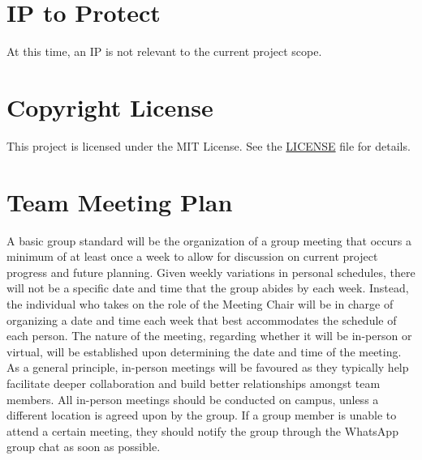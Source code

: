 \documentclass{article}
\begin{document}
\iffalse
\wss{For most teams this section will just state that there is no confidential
information to protect.}
\fi
\section{IP to Protect}

\iffalse
\wss{State whether there is IP to protect.  If there is, point to the agreement.
All students who are working on a project that requires an IP agreement are also
required to sign the ``Intellectual Property Guide Acknowledgement.''}
\fi

At this time, an IP is not relevant to the current project scope.

\section{Copyright License}

\iffalse
\wss{What copyright license is your team adopting.  Point to the license in your
repo.}
\fi

This project is licensed under the MIT License. See the \href{./LICENSE}{LICENSE} file for details.

\section{Team Meeting Plan}

\iffalse
\wss{How often will you meet? where?}

\wss{If the meeting is a physical location (not virtual), out of an abundance of
caution for safety reasons you shouldn't put the location online}

\wss{How often will you meet with your industry advisor?  when?  where?}

\wss{Will meetings be virtual?  At least some meetings should likely be
in-person.}

\wss{How will the meetings be structured?  There should be a chair for all meetings.  There should be an agenda for all meetings.}
\fi

A basic group standard will be the organization of a group meeting that occurs a minimum of at least once a week to
allow for discussion on current project progress and future planning. Given weekly variations in personal schedules, there
will not be a specific date and time that the group abides by each week. Instead, the individual who takes on the
role of the Meeting Chair will be in charge of organizing a date and time each week that best accommodates the
schedule of each person. The nature of the meeting, regarding whether it will be in-person or virtual, will be
established upon determining the date and time of the meeting. As a general principle, in-person meetings will be
favoured as they typically help facilitate deeper collaboration and build better relationships amongst team
members. All in-person meetings should be conducted on campus, unless a different location is agreed upon by the
group. If a group member is unable to attend a certain meeting, they should notify the group through the WhatsApp
group chat as soon as possible.\\
\end{document}
